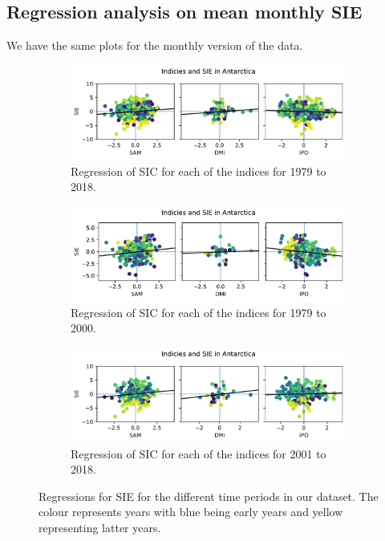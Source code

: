 \subsection{Regression analysis on mean monthly SIE}
We have the same plots for the monthly version of the data.
\begin{figure}[H]
    \begin{subfigure}{\linewidth}
    \centering
    \includegraphics[width=\linewidth]{Images_3.0/regressions/scatter_anomalous_n1_monthly_detrended_1979_2018.pdf}
    \caption{Regression of SIC for each of the indices for 1979 to 2018.}
    \label{fig:scatter_anomalous_n1_annually_1979_2018}
    \end{subfigure}
    
    \begin{subfigure}{\linewidth}
    \centering
    \includegraphics[width=\linewidth]{Images_3.0/regressions/scatter_anomalous_n1_monthly_detrended_1979_2000.pdf}
    \caption{Regression of SIC for each of the indices for 1979 to 2000.}
    \label{fig:scatter_anomalous_n1_annually_1979_2000}
    \end{subfigure}
    
    \begin{subfigure}{\linewidth}
    \centering
    \includegraphics[width=\linewidth]{Images_3.0/regressions/scatter_anomalous_n1_monthly_detrended_2001_2018.pdf}
    \caption{Regression of SIC for each of the indices for 2001 to 2018.}
    \label{fig:scatter_anomalous_n1_annually_2001_2018}
    \end{subfigure}
    \caption[Regressions for SIE for the different time periods in our dataset.]{Regressions for SIE for the different time periods in our dataset. The colour represents years with blue being early years and yellow representing latter years.}
\end{figure}
